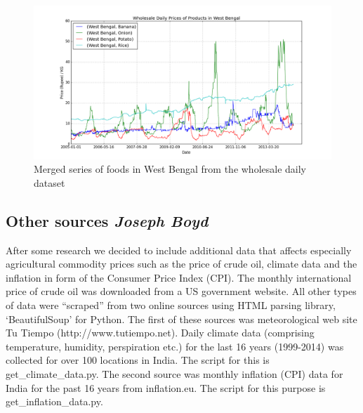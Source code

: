\begin{figure}
    \centering
    \includegraphics[width=.7\textwidth]{./img/merged_west_bengal_products.png}
    \caption{Merged series of foods in West Bengal from the wholesale daily dataset}
\end{figure}

\subsection*{Other sources \footnotesize\emph{Joseph Boyd}}
After some research we decided to include additional data that affects especially agricultural commodity prices such as the price of crude oil, climate data and the inflation in form of the Consumer Price Index (CPI). The monthly international price of crude oil was downloaded from a US government website. All other types of data were ``scraped'' from two online sources using HTML parsing library, `BeautifulSoup' for Python. The first of these sources was meteorological web site Tu Tiempo (http://www.tutiempo.net). Daily climate data (comprising temperature, humidity, perspiration etc.) for the last 16 years (1999-2014) was collected for over 100 locations in India. The script for this is get\_climate\_data.py. The second source was monthly inflation (CPI) data for India for the past 16 years from inflation.eu. The script for this purpose is get\_inflation\_data.py.

